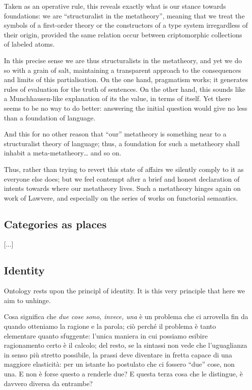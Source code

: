 \documentclass{amsart}
\begin{document}
Taken as an operative rule, this reveals exactly what is our stance towards foundations: we are ``structuralist in the metatheory'', meaning that we treat the symbols of a first-order theory or the constructors of a type system irregardless of their origin, provided the same relation occur between criptomorphic collections of labeled atoms.

In this precise sense we are thus structuralists in the metatheory, and yet we do so with a grain of salt, maintaining a transparent approach to the consequences and limits of this partialisation. On the one hand, pragmatism works; it generates rules of evaluation for the truth of sentences. On the other hand, this sounds like a Munchhausen-like explanation of its the value, in terms of itself. Yet there seems to be no way to do better: answering the initial question would give no less than a foundation of language.

And this for no other reason that ``our'' metatheory is something near to a structuralist theory of language; thus, a foundation for such a metatheory shall inhabit a meta-metatheory\dots{} and so on.

Thus, rather than trying to revert this state of affairs we silently comply to it as everyone else does; but we feel contempt after a brief and honest declaration of intents towards where our metatheory lives. Such a metatheory hinges again on work of Lawvere, and especially on the series of works on functorial semantics.
\subsection{Categories as places}
[...]
\subsection{Identity}
Ontology rests upon the principl of identity. It is this very principle that here we aim to unhinge.

Cosa significa che \emph{due cose sono, invece, una} è un problema che ci arrovella fin da quando otteniamo la ragione e la parola; ciò perché il problema è tanto elementare quanto sfuggente: l'unica maniera in cui possiamo esibire ragionamento certo è il calcolo; del resto, se la sintassi non vede che l'uguaglianza in senso più stretto possibile, la prassi deve diventare in fretta capace di una maggiore elasticità: per un istante ho postulato che ci fossero ``due'' cose, non una. E non è forse questo a renderle due? E questa terza cosa che le distingue, è davvero diversa da entrambe?
\end{document}
